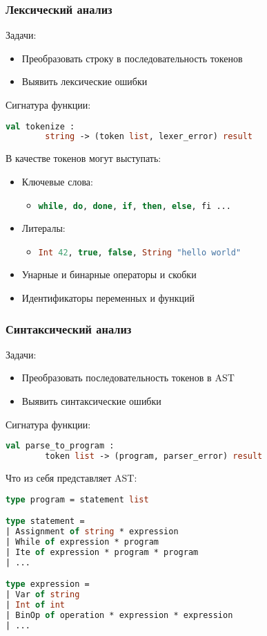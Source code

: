 \documentclass{beamer}
\begin{document}
	\begin{frame}[fragile]
		\frametitle{Лексический анализ}
			Задачи:
			\begin{itemize}
				\item Преобразовать строку в последовательность токенов
				\item Выявить лексические ошибки
			\end{itemize}
			Сигнатура функции:

			\begin{lstlisting}[language=ML] 
val tokenize :
		string -> (token list, lexer_error) result
		\end{lstlisting}

			В качестве токенов могут выступать:
			\begin{itemize}
				\item Ключевые слова:
				\begin{itemize}
					\item \lstinline[language=ML]|while, do, done, if, then, else, fi ...|
				\end{itemize}
				\item Литералы:
				\begin{itemize}
					\item \lstinline[language=ML]|Int 42, true, false, String "hello world"|
				\end{itemize}
				\item Унарные и бинарные операторы и скобки
				\item Идентификаторы переменных и функций
			\end{itemize}
	\end{frame}
	
	\begin{frame}[fragile]
		\frametitle{Синтаксический анализ}
		Задачи:
		\begin{itemize}
			\item Преобразовать последовательность токенов в AST
			\item Выявить синтаксические ошибки
		\end{itemize}
		Сигнатура функции:	
		\begin{lstlisting}[language=ML] 
val parse_to_program :
		token list -> (program, parser_error) result
		\end{lstlisting}
		\end{frame}
	
	\begin{frame}[fragile]
		
		Что из себя представляет AST:
		\begin{lstlisting}[language=ML] 
type program = statement list

type statement =
| Assignment of string * expression
| While of expression * program
| Ite of expression * program * program
| ...

type expression =
| Var of string
| Int of int
| BinOp of operation * expression * expression
| ...
		\end{lstlisting}
	\end{frame}
	
\end{document}
